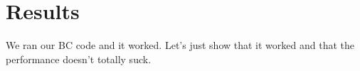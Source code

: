 \section{Results}
\label{sec:results}

We ran our BC code and it worked.   Let's just show that it worked and that the performance doesn't totally suck.

